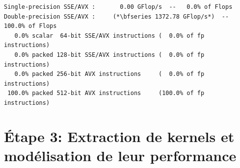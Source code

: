 \begin{lstlisting}[caption=Résultat de l'outil \textit{myflops.sh} utilisé pour compter les instructions flottante exécutées sur un processeur., label={code:mygflops_512_output},
  basicstyle=\footnotesize, frame=tb,
  xleftmargin=.005\textwidth, xrightmargin=.005\textwidth]
Single-precision SSE/AVX :       0.00 GFlop/s  --   0.0% of Flops
Double-precision SSE/AVX :     (*\bfseries 1372.78 GFlop/s*)  -- 100.0% of Flops
   0.0% scalar  64-bit SSE/AVX instructions (  0.0% of fp instructions)
   0.0% packed 128-bit SSE/AVX instructions (  0.0% of fp instructions)
   0.0% packed 256-bit AVX instructions     (  0.0% of fp instructions)
 100.0% packed 512-bit AVX instructions     (100.0% of fp instructions)
\end{lstlisting}












 
 
 
 

\section{Étape 3: Extraction de kernels et modélisation de leur performance}


